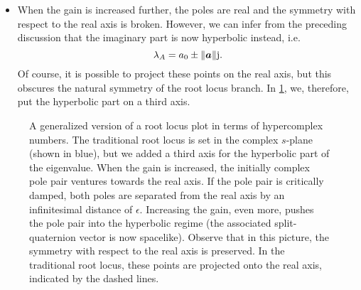 \begin{itemize}
    \item When the gain is increased further, the poles are real and the symmetry with respect to the real axis is broken. However, we can infer from the preceding discussion that the imaginary part is now hyperbolic instead, i.e.
        \begin{equation}
             \lambda_A = a_0 \pm \norm{\vec{a}}\jj.
        \end{equation}
        Of course, it is possible to project these points on the real axis, but this obscures the natural symmetry of the root locus branch. In \cref{fig:root_locus}, we, therefore, put the hyperbolic part on a third axis.
\end{itemize}

\begin{figure}[ht]
    \centering
    
    \caption{A generalized version of a root locus plot in terms of hypercomplex numbers. The traditional root locus is set in the complex \(s\)-plane (shown in blue), but we added a third axis for the hyperbolic part of the eigenvalue. When the gain is increased, the initially complex pole pair ventures towards the real axis. If the pole pair is critically damped, both poles are separated from the real axis by an infinitesimal distance of \(\epsilon\). Increasing the gain, even more, pushes the pole pair into the hyperbolic regime (the associated split-quaternion vector is now spacelike). Observe that in this picture, the symmetry with respect to the real axis is preserved. In the traditional root locus, these points are projected onto the real axis, indicated by the dashed lines. }
    \label{fig:root_locus}
\end{figure}

